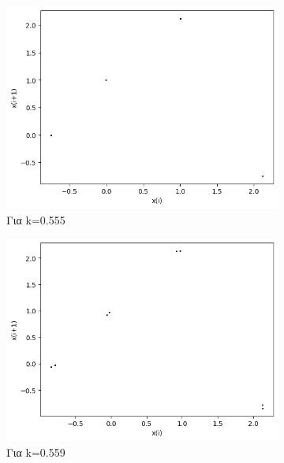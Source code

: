 \begin{figure}[h!]
\begin{subfigure}[b]{0.25\textwidth}
		\includegraphics[width=\textwidth]{LateX images/graphs/k0555}
		\caption{Για k=0.555}
		\label{f:k10}
	\end{subfigure}
	\hfill
	\begin{subfigure}[b]{0.25\textwidth}
		\centering
		\includegraphics[width=\textwidth]{LateX images/graphs/k0559}
		\caption{Για k=0.559}
		\label{f:k11}
	\end{subfigure}
	\hfill
	\begin{subfigure}[b]{0.25\textwidth}
		\centering

\end{subfigure}
\end{figure}
